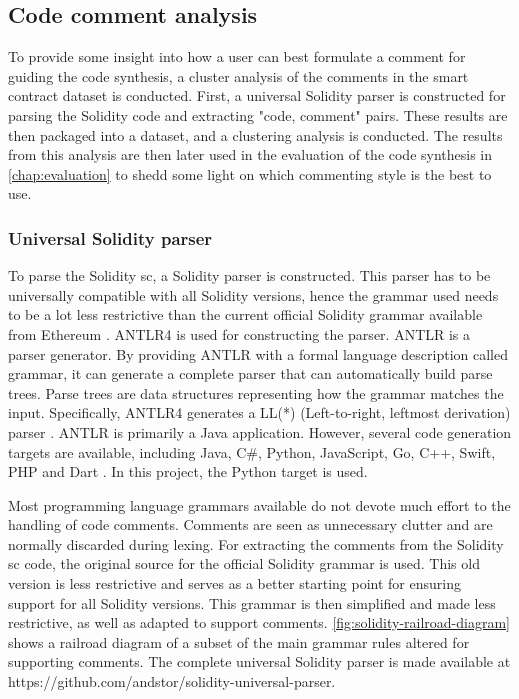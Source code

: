 
\FloatBarrier

\subsection{Code comment analysis}
\label{sec:comment-analysis}
To provide some insight into how a user can best formulate a comment for guiding the code synthesis, a cluster analysis of the comments in the smart contract dataset is conducted. First, a universal Solidity parser is constructed for parsing the Solidity code and extracting "code, comment" pairs. These results are then packaged into a dataset, and a clustering analysis is conducted. The results from this analysis are then later used in the evaluation of the code synthesis in \cref{chap:evaluation} to shedd some light on which commenting style is the best to use.

\subsubsection{Universal Solidity parser}
\label{sec:universal-solidity-parser}
To parse the Solidity \acrshort{sc}, a Solidity parser is constructed. This parser has to be universally compatible with all Solidity versions, hence the grammar used needs to be a lot less restrictive than the current official Solidity grammar available from Ethereum \cite{soliditygrammar}. ANTLR4 \cite{antlr4} is used for constructing the parser. ANTLR is a parser generator. By providing ANTLR with a formal language description called grammar, it can generate a complete parser that can automatically build parse trees. Parse trees are data structures representing how the grammar matches the input. Specifically, ANTLR4 generates a LL(*) (Left-to-right, leftmost derivation) parser \cite{parr2011llstar}. ANTLR is primarily a Java application. However, several code generation targets are available, including Java, C\#, Python, JavaScript, Go, C++, Swift, PHP and Dart \cite{antlr-targets}. In this project, the Python target is used.

Most programming language grammars available do not devote much effort to the handling of code comments. Comments are seen as unnecessary clutter and are normally discarded during lexing. For extracting the comments from the Solidity \acrshort{sc} code, the original source \cite{solidity-antlr4} for the official Solidity grammar \cite{soliditygrammar} is used. This old version is less restrictive and serves as a better starting point for ensuring support for all Solidity versions. This grammar is then simplified and made less restrictive, as well as adapted to support comments. \cref{fig:solidity-railroad-diagram} shows a railroad diagram of a subset of the main grammar rules altered for supporting comments. The complete universal Solidity parser is made available at https://github.com/andstor/solidity-universal-parser.

